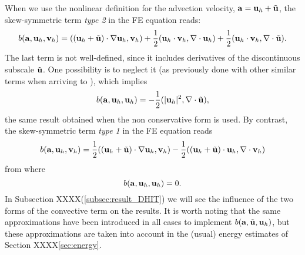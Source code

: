 \begin{remark}
\label{rem-skewsym}
When we use the nonlinear definition for the advection velocity, ${\bf a}={\bf u}_h+\tilde{{\bf u}}$, the skew-symmetric term \textit{type 2}  in the FE equation  reads: 
\begin{equation}
\label{eq-b_skew2_aux1}
b({\bf a},{\bf u}_h,{\bf v}_h)=(({\bf u}_h+\tilde{{\bf u}})\cdot\nabla{\bf u}_h,{\bf v}_h)+\frac{1}{2}({\bf u}_h\cdot{\bf v}_h,\nabla\cdot{\bf u}_h)+\frac{1}{2}({\bf u}_h\cdot{\bf v}_h,\nabla\cdot\tilde{{\bf u}}).
\end{equation}
The last term is not well-defined, since it includes derivatives of the discontinuous subscale $\tilde{{\bf u}}$. One possibility is to neglect it (as previously done with other similar terms when arriving to ), which implies
\begin{equation}
b({\bf a},{\bf u}_h,{\bf u}_h)=-\frac{1}{2}(|{\bf u}_h|^2,\nabla\cdot\tilde{{\bf u}}),
\end{equation}
the same result obtained when the non conservative form is used.
By contrast, the skew-symmetric term \textit{type 1} in the FE equation  reads
\begin{equation}
\label{eq-b_skew1_aux1}
b({\bf a},{\bf u}_h,{\bf v}_h)=\frac{1}{2}(({\bf u}_h+\tilde{{\bf u}})\cdot\nabla{\bf u}_h,{\bf v}_h)-\frac{1}{2}(({\bf u}_h+\tilde{{\bf u}})\cdot{\bf u}_h,\nabla\cdot{\bf v}_h)
\end{equation}
from where
\begin{equation}
b({\bf a},{\bf u}_h,{\bf u}_h)=0.
\end{equation}
In Subsection XXXX(\ref{subsec:result_DHIT}) we will see the influence of the two forms of the convective term on the results.
It is worth noting that the same approximations have been introduced in all cases to implement $b({\bf a},\tilde{{\bf u}},{\bf u}_h)$, but these approximations are taken into account in the (usual) energy estimates of Section XXXX\ref{sec:energy}.
\end{remark}

